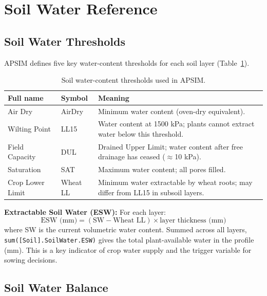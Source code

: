 \section{Soil Water Reference}

\subsection{Soil Water Thresholds}

APSIM defines five key water-content thresholds for each soil layer (Table~\ref{tab:waterlimits}).

\begin{table}[H]
\centering
\small
\caption{Soil water-content thresholds used in APSIM.}
\label{tab:waterlimits}
\renewcommand{\arraystretch}{1.3}
\begin{tabularx}{\textwidth}{l >{\ttfamily}l X}
\toprule
\textbf{Full name}      & \normalfont\textbf{Symbol} & \textbf{Meaning} \\
\midrule
Air Dry          & AirDry  & Minimum water content (oven-dry equivalent). \\
Wilting Point    & LL15    & Water content at 1500 kPa; plants cannot extract water below this threshold. \\
Field Capacity   & DUL     & Drained Upper Limit; water content after free drainage has ceased ($\approx$10 kPa). \\
Saturation       & SAT     & Maximum water content; all pores filled. \\
Crop Lower Limit & Wheat LL & Minimum water extractable by wheat roots; may differ from LL15 in subsoil layers. \\
\bottomrule
\end{tabularx}
\end{table}

\begin{keyconceptbox}
\textbf{Extractable Soil Water (ESW):}
For each layer:
\[
  \text{ESW (mm)} = (\text{SW} - \text{Wheat LL}) \times \text{layer thickness (mm)}
\]
where SW is the current volumetric water content. Summed across all layers, \texttt{sum([Soil].SoilWater.ESW)} gives the total plant-available water in the profile (mm). This is a key indicator of crop water supply and the trigger variable for sowing decisions.
\end{keyconceptbox}

\subsection{Soil Water Balance}

